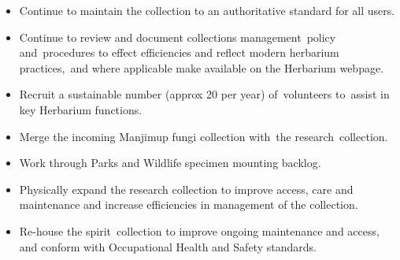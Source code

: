 \documentclass[version=last,
    paper=a4, %
    10pt, %
    usenames,
    dvipsnames,
    oneside, %
    headings=openany, %
    DIV=15 %
]{scrbook}
\begin{document}
\begin{itemize}
\itemsep1pt\parskip0pt
\item
  Continue to maintain the collection to an authoritative standard for
  all users.
\item
  Continue to review and document collections management~policy
  and~procedures to effect efficiencies and reflect modern herbarium
  practices,~and where applicable make available on the Herbarium
  webpage.
\item
  Recruit a sustainable number (approx 20 per year) of~volunteers
  to~assist in key Herbarium functions.
\item
  Merge the incoming Manjimup fungi collection with~the
  research~collection.
\item
  Work through Parks and Wildlife specimen mounting backlog.
\item
  Physically expand the research collection to improve access, care and
  maintenance and increase efficiencies in management of the collection.
\item
  Re-house the spirit~collection to improve ongoing maintenance and
  access, and conform with Occupational Health and Safety standards.
\end{itemize}



\end{document}
